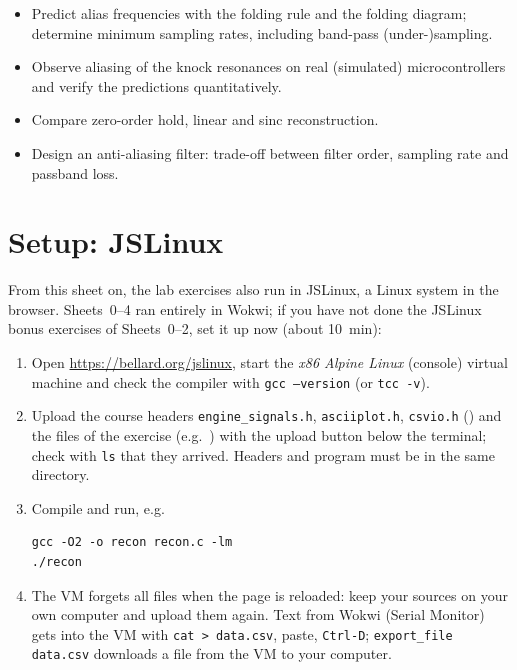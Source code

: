 
\begin{goals}
\begin{itemize}
  \item Predict alias frequencies with the folding rule and the folding
    diagram; determine minimum sampling rates, including band-pass
    (under-)sampling.
  \item Observe aliasing of the knock resonances on real (simulated)
    microcontrollers and verify the predictions quantitatively.
  \item Compare zero-order hold, linear and sinc reconstruction.
  \item Design an anti-aliasing filter: trade-off between filter order,
    sampling rate and passband loss.
\end{itemize}
\end{goals}

\section*{Setup: JSLinux}
From this sheet on, the lab exercises also run in JSLinux, a Linux system in
the browser. Sheets~0--4 ran entirely in Wokwi; if you have not done the JSLinux bonus
exercises of Sheets~0--2, set it up now (about \SI{10}{min}):
\begin{enumerate}
  \item Open \url{https://bellard.org/jslinux}, start the \emph{x86 Alpine
    Linux} (console) virtual machine and check the compiler with
    \texttt{gcc --version} (or \texttt{tcc -v}).
  \item Upload the course headers \texttt{engine\_signals.h},
    \texttt{asciiplot.h}, \texttt{csvio.h} () and the
    files of the exercise (e.g.\ ) with the
    upload button below the terminal; check with \texttt{ls} that they arrived.
    Headers and program must be in the same directory.
  \item Compile and run, e.g.
\begin{lstlisting}[style=shell]
gcc -O2 -o recon recon.c -lm
./recon
\end{lstlisting}
  \item The VM forgets all files when the page is reloaded: keep your sources
    on your own computer and upload them again. Text from Wokwi (Serial
    Monitor) gets into the VM with \texttt{cat > data.csv}, paste,
    \texttt{Ctrl-D}; \texttt{export\_file data.csv} downloads a file from
    the VM to your computer.
\end{enumerate}


